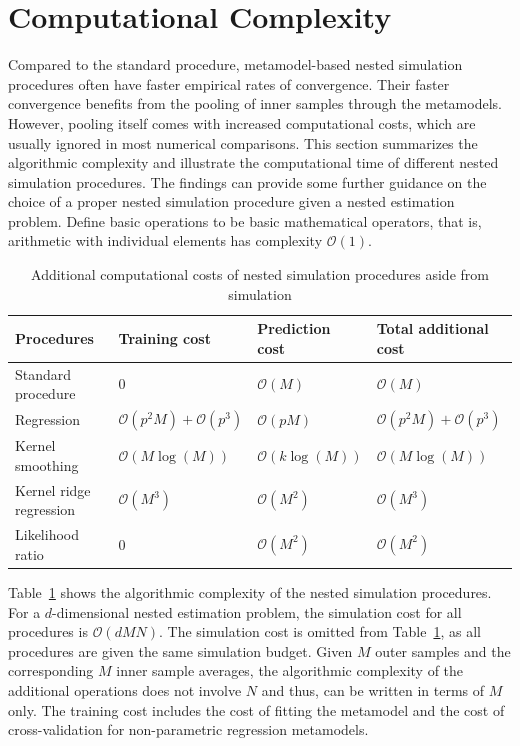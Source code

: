\section{Computational Complexity} \label{sec1:computational-complexity}
Compared to the standard procedure, metamodel-based nested simulation procedures often have faster empirical rates of convergence.
Their faster convergence benefits from the pooling of inner samples through the metamodels. 
However, pooling itself comes with increased computational costs, which are usually ignored in most numerical comparisons. 
This section summarizes the algorithmic complexity and illustrate the computational time of different nested simulation procedures.
The findings can provide some further guidance on the choice of a proper nested simulation procedure given a nested estimation problem.
Define basic operations to be basic mathematical operators, that is, arithmetic with individual elements has complexity $\mathcal{O}(1)$.

\begin{table}[ht]
    \centering  
    \small
    \begin{tabular}{llll}
    \hline
    \textbf{Procedures}      & \textbf{Training cost}                    &  \textbf{Prediction cost}    & \textbf{Total additional cost} \\ \hline \hline
    Standard procedure       &  $0$                                      &  $\mathcal{O}(M)$            & $\mathcal{O}(M)$ \\ 
    Regression               &  $\mathcal{O}(p^2M) + \mathcal{O}(p^3)$   &  $\mathcal{O}(pM)$           & $\mathcal{O}(p^2M) + \mathcal{O}(p^3)$ \\
    Kernel smoothing         &  $\mathcal{O}(M\log(M))$                  &  $\mathcal{O}(k\log(M))$     & $\mathcal{O}(M\log(M))$ \\
    Kernel ridge regression  &  $\mathcal{O}(M^3)$                       &  $\mathcal{O}(M^2)$          & $\mathcal{O}(M^3)$ \\
    Likelihood ratio         &  $0$                                      &  $\mathcal{O}(M^2)$          & $\mathcal{O}(M^2)$ \\
    \hline
    \end{tabular} 
    \caption{Additional computational costs of nested simulation procedures aside from simulation}
    \label{tab1:complexity}
\end{table}

Table~\ref{tab1:complexity} shows the algorithmic complexity of the nested simulation procedures.
For a $d$-dimensional nested estimation problem, the simulation cost for all procedures is $\mathcal{O}(dMN)$.
The simulation cost is omitted from Table~\ref{tab1:complexity}, as all procedures are given the same simulation budget.
Given $M$ outer samples and the corresponding $M$ inner sample averages, the algorithmic complexity of the additional operations does not involve $N$ and thus, can be written in terms of $M$ only. 
The training cost includes the cost of fitting the metamodel and the cost of cross-validation for non-parametric regression metamodels.


